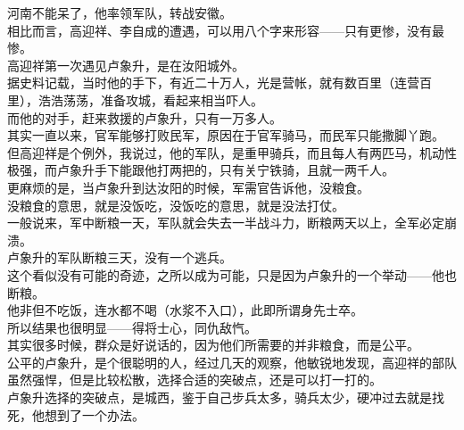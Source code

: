 \begin{multicols}{\theparacolNo}
河南不能呆了，他率领军队，转战安徽。\\

相比而言，高迎祥、李自成的遭遇，可以用八个字来形容——只有更惨，没有最惨。\\

高迎祥第一次遇见卢象升，是在汝阳城外。\\

据史料记载，当时他的手下，有近二十万人，光是营帐，就有数百里（连营百里），浩浩荡荡，准备攻城，看起来相当吓人。\\

而他的对手，赶来救援的卢象升，只有一万多人。\\

其实一直以来，官军能够打败民军，原因在于官军骑马，而民军只能撒脚丫跑。\\

但高迎祥是个例外，我说过，他的军队，是重甲骑兵，而且每人有两匹马，机动性极强，而卢象升手下能跟他打两把的，只有关宁铁骑，且就一两千人。\\

更麻烦的是，当卢象升到达汝阳的时候，军需官告诉他，没粮食。\\

没粮食的意思，就是没饭吃，没饭吃的意思，就是没法打仗。\\

一般说来，军中断粮一天，军队就会失去一半战斗力，断粮两天以上，全军必定崩溃。\\

卢象升的军队断粮三天，没有一个逃兵。\\

这个看似没有可能的奇迹，之所以成为可能，只是因为卢象升的一个举动——他也断粮。\\

他非但不吃饭，连水都不喝（水浆不入口），此即所谓身先士卒。\\

所以结果也很明显——得将士心，同仇敌忾。\\

其实很多时候，群众是好说话的，因为他们所需要的并非粮食，而是公平。\\

公平的卢象升，是个很聪明的人，经过几天的观察，他敏锐地发现，高迎祥的部队虽然强悍，但是比较松散，选择合适的突破点，还是可以打一打的。\\

卢象升选择的突破点，是城西，鉴于自己步兵太多，骑兵太少，硬冲过去就是找死，他想到了一个办法。\\


\end{multicols}

